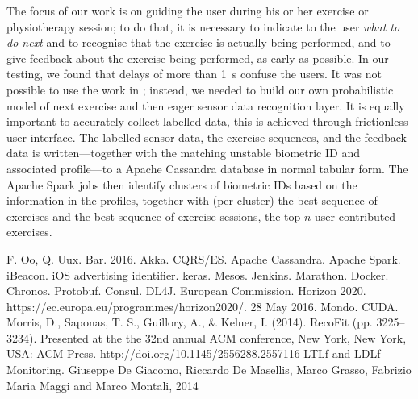 \documentclass[a4paper, 10 pt, conference]{IEEEtran}
\begin{document}
The focus of our work is on guiding the user during his or her exercise or physiotherapy session; to do that, it is necessary to indicate to the user \emph{what to do next} and to recognise that the exercise is actually being performed, and to give feedback about the exercise being performed, as early as possible. In our testing, we found that delays of more than \SI{1}{\second} confuse the users. It was not possible to use the work in \cite{morris:2014ir}; instead, we needed to build our own probabilistic model of next exercise and then eager sensor data recognition layer. It is equally important to accurately collect labelled data, this is achieved through frictionless user interface. The labelled sensor data, the exercise sequences, and the feedback data is written---together with the matching unstable biometric ID and associated profile---to a Apache Cassandra database in normal tabular form. The Apache Spark jobs then identify clusters of biometric IDs based on the information in the profiles, together with (per cluster) the best sequence of exercises and the best sequence of exercise sessions, the top $n$ user-contributed exercises.

\addtolength{\textheight}{-12cm}  %

\begin{thebibliography}{99}

 F. Oo, Q. Uux. Bar. 2016.
 Akka.
 CQRS/ES.
 Apache Cassandra.
 Apache Spark.
 iBeacon.
 iOS advertising identifier.
 keras.
 Mesos.
 Jenkins.
 Marathon.
 Docker.
 Chronos.
 Protobuf.
 Consul.
 DL4J.
 European Commission. Horizon 2020. https://ec.europa.eu/programmes/horizon2020/. 28 May 2016.
 Mondo.
 CUDA.
 Morris, D., Saponas, T. S., Guillory, A., \& Kelner, I. (2014). RecoFit (pp. 3225--3234). Presented at the the 32nd annual ACM conference, New York, New York, USA: ACM Press. http://doi.org/10.1145/2556288.2557116
 LTLf and LDLf Monitoring. Giuseppe De Giacomo, Riccardo De Masellis, Marco Grasso, Fabrizio Maria Maggi and Marco Montali, 2014

\end{thebibliography}
\end{document}
